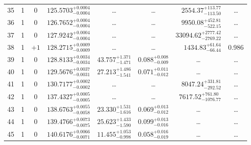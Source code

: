 \begin{table*}[!]
\begin{tabular}{llcrrlrc}
35 & 1 & 0 & $    125.5703_{-      0.0004}^{+      0.0004}$ & \multicolumn{1}{c}{\dots} & \multicolumn{1}{c}{\dots} & $     2554.37_{-      113.50}^{+      113.77}$ & \dots\\[1pt]
36 & 1 & 0 & $    126.7652_{-      0.0004}^{+      0.0004}$ & \multicolumn{1}{c}{\dots} & \multicolumn{1}{c}{\dots} & $     9950.08_{-      522.15}^{+      452.81}$ & \dots \\[1pt]
37 & 1 & 0 & $    127.9242_{-      0.0004}^{+      0.0004}$ & \multicolumn{1}{c}{\dots} & \multicolumn{1}{c}{\dots} & $    33094.62_{-     2769.22}^{+     2777.42}$ & \dots \\[1pt]
38 & 1 & $+1$ & $    128.2715_{-      0.0009}^{+      0.0009}$ & \multicolumn{1}{c}{\dots} & \multicolumn{1}{c}{\dots} & $     1434.83_{-       66.44}^{+       61.64}$ & 0.986\\[1pt]
39 & 1 & 0 & $    128.8133_{-      0.0034}^{+      0.0034}$ & $      43.757_{-       1.471}^{+       1.371}$ & $       0.088_{-       0.009}^{+       0.008}$ & \multicolumn{1}{c}{\dots} & \dots\\[1pt]
40 & 1 & 0 & $    129.5676_{-      0.0031}^{+      0.0037}$ & $      27.213_{-       1.541}^{+       1.486}$ & $       0.071_{-       0.012}^{+       0.011}$ & \multicolumn{1}{c}{\dots} & \dots\\[1pt]
41 & 1 & 0 & $    130.7177_{-      0.0002}^{+      0.0002}$ & \multicolumn{1}{c}{\dots} & \multicolumn{1}{c}{\dots} & $     8047.24_{-      292.52}^{+      331.81}$ & \dots\\[1pt]

42 & 1 & 0 & $    137.4327_{-      0.0005}^{+      0.0005}$ & \multicolumn{1}{c}{\dots} & \multicolumn{1}{c}{\dots} & $     7617.52_{-     1076.77}^{+      761.80}$ & \dots \\[1pt]
43 & 1 & 0 & $    138.6763_{-      0.0058}^{+      0.0055}$ & $      23.330_{-       1.616}^{+       1.531}$ & $       0.069_{-       0.012}^{+       0.013}$ & \multicolumn{1}{c}{\dots} & \dots \\[1pt]
44 & 1 & 0 & $    139.4766_{-      0.0075}^{+      0.0073}$ & $      25.623_{-       1.590}^{+       1.433}$ & $       0.099_{-       0.016}^{+       0.013}$ & \multicolumn{1}{c}{\dots} & \dots \\[1pt]
45 & 1 & 0 & $    140.6176_{-      0.0071}^{+      0.0066}$ & $      11.455_{-       0.998}^{+       1.053}$ & $       0.058_{-       0.019}^{+       0.016}$ & \multicolumn{1}{c}{\dots} & \dots \\[1pt]


\end{tabular}
\end{table*}
